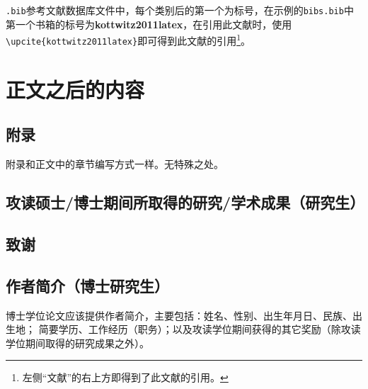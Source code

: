 \texttt{.bib}参考文献数据库文件中，每个类别后的第一个为标号，在示例的\texttt{bibs.bib}中第一个书箱的标号为\textbf{kottwitz2011latex}，在引用此文献时，使用\verb|\upcite{kottwitz2011latex}|即可得到此文献的引用\footnote{左侧“文献”的右上方即得到了此文献的引用。}。

\section{正文之后的内容}
\subsection{附录}
附录和正文中的章节编写方式一样。无特殊之处。
\subsection{攻读硕士\slash 博士期间所取得的研究\slash 学术成果（研究生）}
\subsection{致谢}
\subsection{作者简介（博士研究生）}
博士学位论文应该提供作者简介，主要包括：姓名、性别、出生年月日、民族、出生地；
简要学历、工作经历（职务）；以及攻读学位期间获得的其它奖励（除攻读学位期间取得的研究成果之外）。
